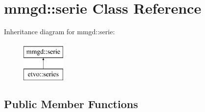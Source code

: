 \section{mmgd\+:\+:serie Class Reference}
\label{classmmgd_1_1serie}
Inheritance diagram for mmgd\+:\+:serie\+:\begin{figure}[H]
\begin{center}
\leavevmode
\includegraphics[height=2.000000cm]{classmmgd_1_1serie}
\end{center}
\end{figure}
\subsection*{Public Member Functions}
